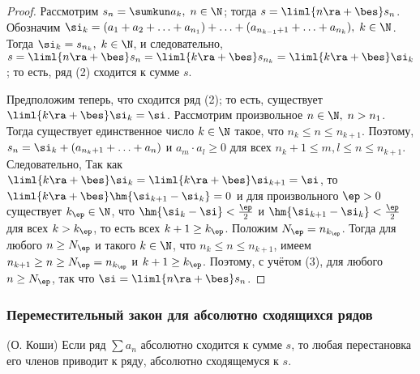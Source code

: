\documentclass[a4paper]{article}
\begin{document}
\begin{proof}
Рассмотрим $s_n=\sumkun a_k, \; n\in\N$; тогда
$s=\liml{n\ra+\bes}s_n$. Обозначим $\si_k = (a_1+a_2+\ldots+
a_{n_1}) + \ldots + (a_{n_{k-1}+1} + \ldots + a_{n_k}), \; k\in\N$.
Тогда $\si_k = s_{n_k}, \; k\in\N$, и следовательно,
$s=\liml{n\ra+\bes} s_n = \liml{k\ra+\bes} s_{n_k} =
\liml{k\ra+\bes} \si_k$; то есть, ряд (2) сходится к сумме $s$.

Предположим теперь, что сходится ряд (2); то есть, существует
$\liml{k\ra+\bes} \si_k=\si$. Рассмотрим произвольное $n\in\N, \;
n>n_1$. Тогда существует единственное число $k\in\N$ такое, что $n_k
\le n \le n_{k+1}$. Поэтому, $s_n = \si_k + (a_{n_k+1} + \ldots +
a_n)$ и $a_m\cdot a_l \ge 0$ для всех $n_k+1\le m, l \le n \le
n_{k+1}$. Следовательно,  Так как $\liml{k\ra+\bes} \si_k =
\liml{k\ra+\bes} \si_{k+1} = \si$, то $\liml{k\ra+\bes}
\hm{\si_{k+1} - \si_k}=0$ и для произвольного $\ep>0$ существует
$k_{\ep}\in\N$, что $\hm{\si_k - \si}<\frac{\ep}2$ и $\hm{\si_{k+1}
- \si_k} < \frac{\ep}2$ для всех $k>k_{\ep}$, то есть всех $k+1\ge
k_{\ep}$. Положим $N_{\ep} = n_{k_{\ep}}$. Тогда для любого $n\ge
N_{\ep}$ и такого $k\in\N$, что $n_k \le n \le n_{k+1}$, имеем
$n_{k+1} \ge n \ge N_{\ep} = n_{k_{\ep}}$ и $k+1\ge k_{\ep}$.
Поэтому, с учётом (3),  для
любого $n\ge N_{\ep}$, так что $\si = \liml{n\ra+\bes} s_n$.
\end{proof}

\subsubsection{Переместительный закон для абсолютно сходящихся
рядов}
\begin{theorem}
(О. Коши) Если ряд $\sum a_n$ абсолютно сходится к сумме $s$, то
любая перестановка его членов приводит к ряду, абсолютно сходящемуся
к $s$.
\end{theorem}
\end{document}
